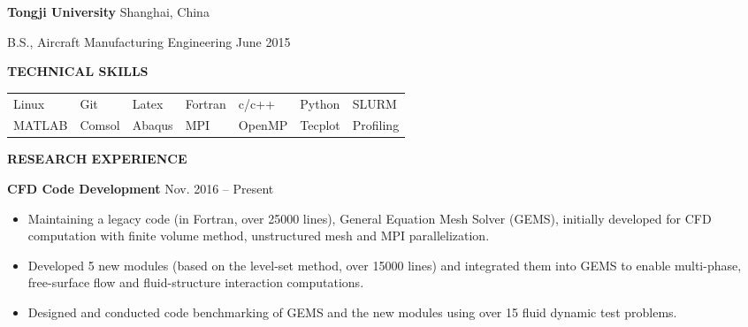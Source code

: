 \documentclass[11pt, letterpaper]{article}
\begin{document}
\textbf{Tongji University} 
\hfill
Shanghai, China

B.S., Aircraft Manufacturing Engineering \hfill June 2015

\vskip 9pt

% 
% 

\textbf{TECHNICAL SKILLS}

\fullrule

\begin{tabular}{@{} l l l l l l l @{}}
   Linux & Git & Latex & Fortran & c/c++ & Python & SLURM \\
   MATLAB & Comsol & Abaqus & MPI & OpenMP & Tecplot & Profiling
\end{tabular}

\vspace{9pt}

\textbf{RESEARCH EXPERIENCE}

\fullrule

\textbf{CFD Code Development} \hfill Nov. 2016 -- Present
\begin{itemize}[leftmargin=*, labelsep=5mm]
   \item Maintaining a legacy code (in Fortran, over 25000 lines), General Equation Mesh Solver
      (GEMS), initially developed for CFD computation with finite volume method, unstructured mesh
      and MPI parallelization.
   \item Developed 5 new modules (based on the level-set method, over 15000 lines) and integrated
      them into GEMS to enable multi-phase, free-surface flow and fluid-structure interaction
      computations.
   \item Designed and conducted code benchmarking of GEMS and the new modules using over 15 fluid
      dynamic test problems. 
\end{itemize}

\vspace{3pt}
\end{document}
